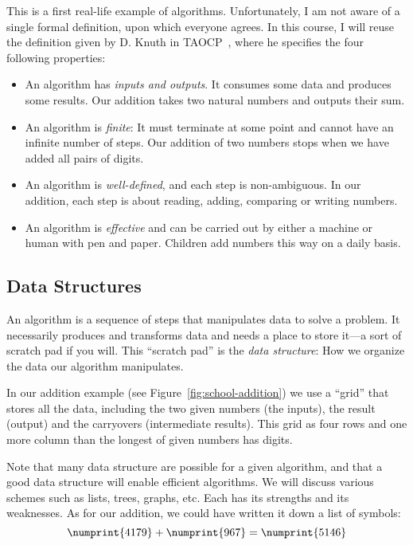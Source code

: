 \documentclass{aldast}
\begin{document}
This is a first real-life example of algorithms. Unfortunately, I am
not aware of a single formal definition, upon which everyone
agrees. In this course,
I will reuse the definition given by D. Knuth in
TAOCP~\cite[p. 5--6]{knuth1978}, where he specifies the four following
properties:
\begin{itemize}
\item An algorithm has \emph{inputs and outputs}. It consumes some data
  and produces some results. Our addition takes two natural numbers
  and outputs their sum.
\item An algorithm is \emph{finite}: It must terminate at some point
  and cannot have an infinite number of steps. Our addition of two
  numbers stops when we have added all pairs of digits.
\item An algorithm is \emph{well-defined}, and each step is
  non-ambiguous. In our addition, each step is about reading, adding,
  comparing or writing numbers.
\item An algorithm is \emph{effective} and can be carried out by
  either a machine or human with pen and paper. Children add numbers
  this way on a daily basis.
\end{itemize}


\subsection{Data Structures}

An algorithm is a sequence of steps that manipulates data to solve a
problem. It necessarily produces and transforms data and needs a
place to store it---a sort of scratch pad if you will. This ``scratch
pad'' is the \emph{data structure}: How we organize the data
our algorithm manipulates.

In our addition example (see Figure~\ref{fig:school-addition}) we use
a ``grid'' that stores all the data, including the two
given numbers (the inputs), the result (output) and the carryovers
(intermediate results). This grid as four rows and one more column than
the longest of given numbers has digits.

Note that many data structure are possible for a given algorithm, and
that a good data structure will enable efficient algorithms. We will
discuss various schemes such as lists, trees, graphs, etc. Each has
its strengths and its weaknesses. As for our addition, we could have
written it down a list of symbols:
\begin{equation}
\numprint{4179} + \numprint{967} = \numprint{5146}
\end{equation}
\end{document}
